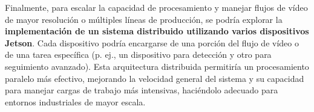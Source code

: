 \documentclass[11pt,spanish,listoffigures,listoftables]{tfgetsinf}
\begin{document}
Finalmente, para escalar la capacidad de procesamiento y manejar flujos de vídeo de mayor resolución o múltiples líneas de producción, se podría explorar la \textbf{implementación de un sistema distribuido utilizando varios dispositivos Jetson}. Cada dispositivo podría encargarse de una porción del flujo de vídeo o de una tarea específica (p. ej., un dispositivo para detección y otro para seguimiento avanzado). Esta arquitectura distribuida permitiría un procesamiento paralelo más efectivo, mejorando la velocidad general del sistema y su capacidad para manejar cargas de trabajo más intensivas, haciéndolo adecuado para entornos industriales de mayor escala.


\printglossary[type=\acronymtype]





\end{document}
